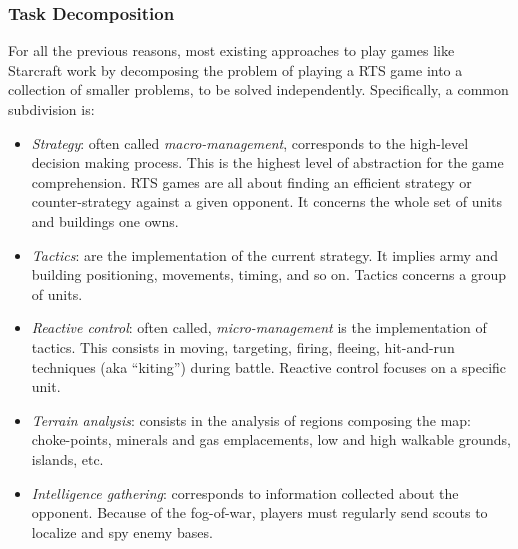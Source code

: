 \documentclass[journal]{IEEEtran}
\begin{document}
\subsubsection{Task Decomposition}
For all the previous reasons, most existing approaches to play games like Starcraft work by decomposing the problem of playing a RTS game into a collection of smaller problems, to be solved independently. Specifically, a common subdivision is:
\begin{itemize}
\item {\em Strategy}: often called {\em macro-management}, corresponds to the high-level decision making process.  This is
  the  highest level of  abstraction for  the game  comprehension. RTS
  games   are   all   about   finding   an   efficient   strategy   or
  counter-strategy  against a  given opponent.  It concerns  the whole
  set of  units and buildings  one owns. %
\item  {\em Tactics}: are  the implementation  of the  current  strategy. It
  implies  army and  building positioning,  movements, timing,  and so
  on.  Tactics concerns a  group of  units. %
\item  {\em Reactive  control}: often called, {\em micro-management} is  the  implementation  of  tactics.  This
  consists   in  moving,   targeting,  firing,   fleeing,  hit-and-run
  techniques (aka ``kiting'')  during battle. Reactive control focuses
  on a specific unit. %
%
\item {\em Terrain analysis}: consists  in the analysis of regions composing
  the  map:  choke-points,  minerals  and  gas emplacements,  low  and  high
  walkable grounds, islands, etc.
\item {\em Intelligence gathering}:  corresponds to information collected about
  the  opponent. Because of  the fog-of-war,  players must
  regularly send scouts to localize and spy enemy bases.%
\end{itemize}
\end{document}
